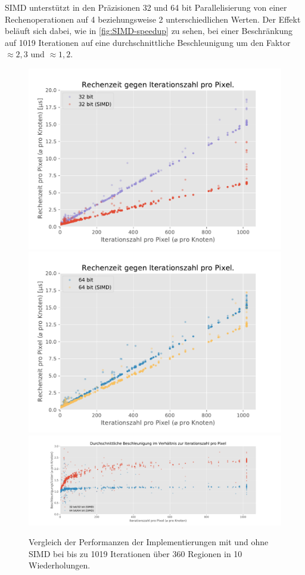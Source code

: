 


SIMD unterstützt in den Präzisionen 32 und 64 bit Parallelisierung von einer Rechenoperationen auf
4 beziehungsweise 2 unterschiedlichen Werten. Der Effekt beläuft sich dabei, wie in \autoref{fig:SIMD-speedup} zu sehen,
bei einer Beschränkung auf 1019 Iterationen auf eine durchschnittliche Beschleunigung um den Faktor $\approx2,3$ und $\approx1,2$.

\begin{figure}
	\centering
	\includegraphics[width=0.45\linewidth]{img/Evaluation/simd/itvscmp32.pdf}
	\includegraphics[width=0.45\linewidth]{img/Evaluation/simd/itvscmp64.pdf}
	\includegraphics[width=\linewidth]{img/Evaluation/simd/speedup.pdf}
	\caption{Vergleich der Performanzen der Implementierungen mit und ohne SIMD bei bis zu 1019 Iterationen über 360 Regionen in 10 Wiederholungen.}
	\label{fig:SIMD-speedup}
	\label{fig:SIMD-speedup-vs-comptime}
\end{figure}

